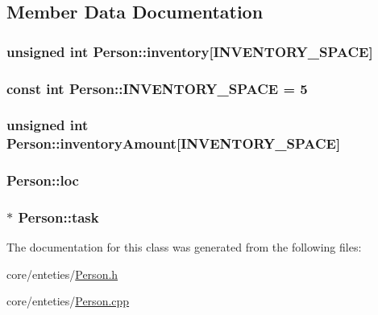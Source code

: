 \subsection{Member Data Documentation}
\hypertarget{classPerson_a26f2cf2da357f14c2185c218ca5c215c}{
\subsubsection[{inventory}]{\setlength{\rightskip}{0pt plus 5cm}unsigned int Person\-::inventory\mbox{[}{\bf I\-N\-V\-E\-N\-T\-O\-R\-Y\-\_\-\-S\-P\-A\-C\-E}\mbox{]}}}\label{classPerson_a26f2cf2da357f14c2185c218ca5c215c}
\hypertarget{classPerson_a5d6040a07a5745a1dc62c6d6d540cca8}{
\subsubsection[{I\-N\-V\-E\-N\-T\-O\-R\-Y\-\_\-\-S\-P\-A\-C\-E}]{\setlength{\rightskip}{0pt plus 5cm}const int Person\-::\-I\-N\-V\-E\-N\-T\-O\-R\-Y\-\_\-\-S\-P\-A\-C\-E = 5\hspace{0.3cm}{\ttfamily [static]}}}\label{classPerson_a5d6040a07a5745a1dc62c6d6d540cca8}
\hypertarget{classPerson_a98efc22a6f7c7f5fc099aa4fb7e70451}{
\subsubsection[{inventory\-Amount}]{\setlength{\rightskip}{0pt plus 5cm}unsigned int Person\-::inventory\-Amount\mbox{[}{\bf I\-N\-V\-E\-N\-T\-O\-R\-Y\-\_\-\-S\-P\-A\-C\-E}\mbox{]}}}\label{classPerson_a98efc22a6f7c7f5fc099aa4fb7e70451}
\hypertarget{classPerson_a04c52986c5a7d61cb8a92e7069b22c11}{
\subsubsection[{loc}]{ Person\-::loc}}\label{classPerson_a04c52986c5a7d61cb8a92e7069b22c11}
\hypertarget{classPerson_a944dd7acfce7fb981e4c315f94b08ad9}{
\subsubsection[{task}]{$\ast$ Person\-::task}}\label{classPerson_a944dd7acfce7fb981e4c315f94b08ad9}


The documentation for this class was generated from the following files\-:\begin{DoxyCompactItemize}
\item 
core/enteties/\hyperlink{Person_8h}{Person.\-h}\item 
core/enteties/\hyperlink{Person_8cpp}{Person.\-cpp}\end{DoxyCompactItemize}
